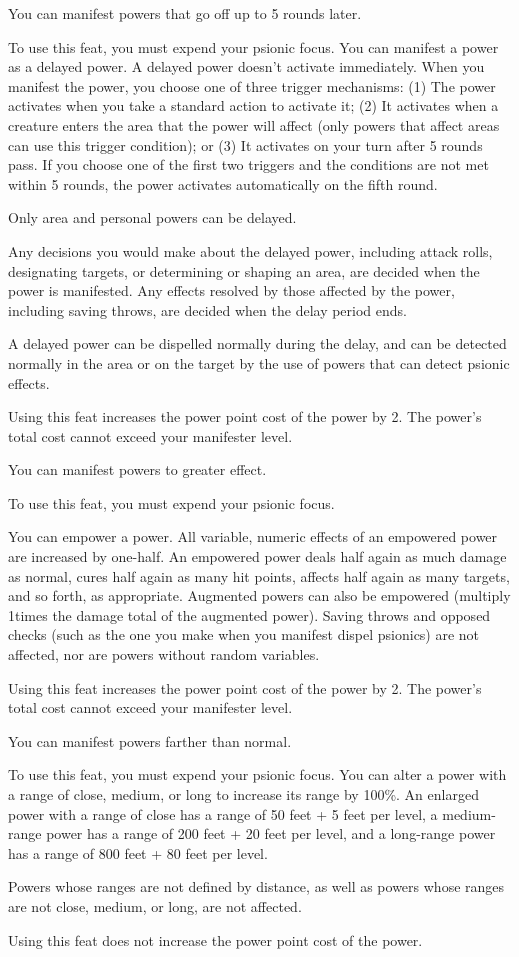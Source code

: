 {You can manifest powers that go off up to 5 rounds later.}
{}
{To use this feat, you must expend your psionic focus. You can manifest a power as a delayed power. A delayed power doesn’t activate immediately. When you manifest the power, you choose one of three trigger mechanisms: (1) The power activates when you take a standard action to activate it; (2) It activates when a creature enters the area that the power will affect (only powers that affect areas can use this trigger condition); or (3) It activates on your turn after 5 rounds pass. If you choose one of the first two triggers and the conditions are not met within 5 rounds, the power activates automatically on the fifth round.

Only area and personal powers can be delayed.

Any decisions you would make about the delayed power, including attack rolls, designating targets, or determining or shaping an area, are decided when the power is manifested. Any effects resolved by those affected by the power, including saving throws, are decided when the delay period ends.

A delayed power can be dispelled normally during the delay, and can be detected normally in the area or on the target by the use of powers that can detect psionic effects.

Using this feat increases the power point cost of the power by 2. The power’s total cost cannot exceed your manifester level.}{}{}

{You can manifest powers to greater effect.}
{}
{To use this feat, you must expend your psionic focus.

You can empower a power. All variable, numeric effects of an empowered power are increased by one-half. An empowered power deals half again as much damage as normal, cures half again as many hit points, affects half again as many targets, and so forth, as appropriate. Augmented powers can also be empowered (multiply 1\onehalf times the damage total of the augmented power). Saving throws and opposed checks (such as the one you make when you manifest dispel psionics) are not affected, nor are powers without random variables.

Using this feat increases the power point cost of the power by 2. The power’s total cost cannot exceed your manifester level.}{}{}

{You can manifest powers farther than normal.}
{}
{To use this feat, you must expend your psionic focus. You can alter a power with a range of close, medium, or long to increase its range by 100\%. An enlarged power with a range of close has a range of 50 feet + 5 feet per level, a medium-range power has a range of 200 feet + 20 feet per level, and a long-range power has a range of 800 feet + 80 feet per level.

Powers whose ranges are not defined by distance, as well as powers whose ranges are not close, medium, or long, are not affected.

Using this feat does not increase the power point cost of the power.}{}{}

